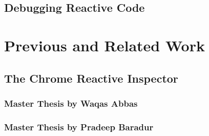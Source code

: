 	

	\subsection{Debugging Reactive Code}
	


\section{Previous and Related Work}
	\subsection{The Chrome Reactive Inspector}		
		\subsubsection{Master Thesis by Waqas Abbas}
		
		\subsubsection{Master Thesis by Pradeep Baradur}
		
